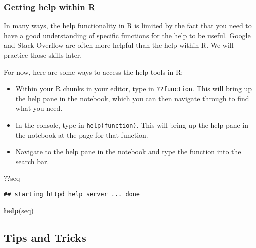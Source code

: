 \documentclass[
]{article}
\newenvironment{Shaded}{\begin{snugshade}}{\end{snugshade}}
\newcommand{\KeywordTok}[1]{\textcolor[rgb]{0.13,0.29,0.53}{\textbf{#1}}}
\newcommand{\NormalTok}[1]{#1}
\begin{document}
\hypertarget{getting-help-within-r}{%
\subsubsection{Getting help within R}\label{getting-help-within-r}}

In many ways, the help functionality in R is limited by the fact that
you need to have a good understanding of specific functions for the help
to be useful. Google and Stack Overflow are often more helpful than the
help within R. We will practice those skills later.

For now, here are some ways to access the help tools in R:

\begin{itemize}
\item
  Within your R chunks in your editor, type in \texttt{??function}. This
  will bring up the help pane in the notebook, which you can then
  navigate through to find what you need.
\item
  In the console, type in \texttt{help(function)}. This will bring up
  the help pane in the notebook at the page for that function.
\item
  Navigate to the help pane in the notebook and type the function into
  the search bar.
\end{itemize}

\begin{Shaded}
\begin{Highlighting}[]
\NormalTok{??seq}
\end{Highlighting}
\end{Shaded}

\begin{verbatim}
## starting httpd help server ... done
\end{verbatim}

\begin{Shaded}
\begin{Highlighting}[]
\KeywordTok{help}\NormalTok{(seq)}
\end{Highlighting}
\end{Shaded}

\hypertarget{tips-and-tricks}{%
\subsection{Tips and Tricks}\label{tips-and-tricks}}
\end{document}
